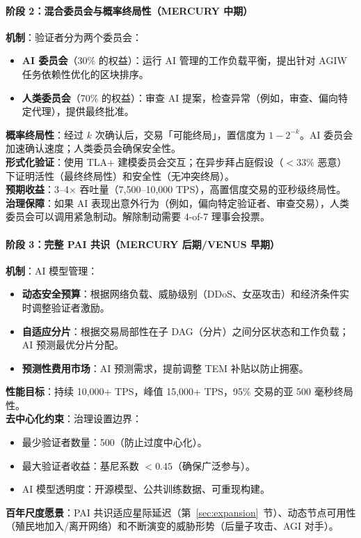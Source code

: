\documentclass[11pt]{article}
\begin{document}
\paragraph{阶段 2：混合委员会与概率终局性（MERCURY 中期）}
\textbf{机制}：验证者分为两个委员会：
\begin{itemize}[noitemsep]
  \item \textbf{AI 委员会}（30\% 的权益）：运行 AI 管理的工作负载平衡，提出针对 AGIW 任务依赖性优化的区块排序。
  \item \textbf{人类委员会}（70\% 的权益）：审查 AI 提案，检查异常（例如，审查、偏向特定代理），提供最终批准。
\end{itemize}
\textbf{概率终局性}：经过 $k$ 次确认后，交易「可能终局」，置信度为 $1 - 2^{-k}$。AI 委员会加速确认速度；人类委员会确保安全性。\\
\textbf{形式化验证}：使用 TLA+ 建模委员会交互；在异步拜占庭假设（$<33\%$ 恶意）下证明活性（最终终局性）和安全性（无冲突终局）。\\
\textbf{预期收益}：3--4$\times$ 吞吐量（7,500--10,000 TPS），高置信度交易的亚秒级终局性。\\
\textbf{治理保障}：如果 AI 表现出意外行为（例如，偏向特定验证者、审查交易），人类委员会可以调用紧急制动。解除制动需要 4-of-7 理事会投票。

\paragraph{阶段 3：完整 PAI 共识（MERCURY 后期/VENUS 早期）}
\textbf{机制}：AI 模型管理：
\begin{itemize}[noitemsep]
  \item \textbf{动态安全预算}：根据网络负载、威胁级别（DDoS、女巫攻击）和经济条件实时调整验证者激励。
  \item \textbf{自适应分片}：根据交易局部性在子 DAG（分片）之间分区状态和工作负载；AI 预测最优分片分配。
  \item \textbf{预测性费用市场}：AI 预测需求，提前调整 TEM 补贴以防止拥塞。
\end{itemize}
\textbf{性能目标}：持续 10,000+ TPS，峰值 15,000+ TPS，95\% 交易的亚 500 毫秒终局性。\\
\textbf{去中心化约束}：治理设置边界：
\begin{itemize}[noitemsep]
  \item 最少验证者数量：500（防止过度中心化）。
  \item 最大验证者收益：基尼系数 $<0.45$（确保广泛参与）。
  \item AI 模型透明度：开源模型、公共训练数据、可重现构建。
\end{itemize}
\textbf{百年尺度愿景}：PAI 共识适应星际延迟（第~\ref{sec:expansion}~节）、动态节点可用性（殖民地加入/离开网络）和不断演变的威胁形势（后量子攻击、AGI 对手）。
\end{document}
